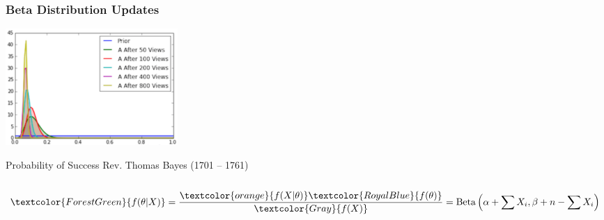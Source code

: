 \documentclass[xcolor={dvipsnames}]{beamer}
\begin{document}
\frame
{
\frametitle{Beta Distribution Updates}


\includegraphics[height=1.75in]{stuff/bayesian-updates-1.png}\hspace{0.4em}


\hspace{6em}\tiny Probability of Success\hspace{11em} Rev. Thomas Bayes (1701 -- 1761) \\ ${}$\\

\large
$$\textcolor{ForestGreen}{f(\theta|X)} = \frac{\textcolor{orange}{f(X|\theta)}\textcolor{RoyalBlue}{f(\theta)}}{\textcolor{Gray}{f(X)}} = \text{Beta}\left(\alpha + \sum X_i, \beta + n-\sum X_i\right)$$


}
\end{document}
